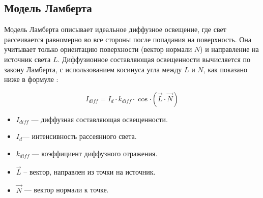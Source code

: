%
%
%
%

\subsection{Модель Ламберта}

Модель Ламберта описывает идеальное диффузное освещение, где свет рассеивается равномерно во все стороны после попадания на поверхность. \cite{lightmodf} Она учитывает только ориентацию поверхности (вектор нормали $N$) и направление на источник света $L$. Диффузионное составляющая освещенности вычисляется по закону Ламберта, с использованием косинуса угла между $L$ и $N$, как показано ниже в формуле \cite{lightmod}:


\begin{equation}\label{lamber}
	I_{diff}=I_{d} \cdot k_{diff} \cdot \cos{\cdot (\vec L \cdot \vec N)}
\end{equation}

\begin{itemize}
	\item $I_{diff}​$ --- диффузная составляющая освещенности.
	\item $I_{d}$​ --- интенсивность рассеянного света.
	\item $k_{diff}​$ --- коэффициент диффузного отражения.
	\item $\vec L$ -- вектор, направлен из точки на источник.
	\item $\vec N$ --- вектор нормали к точке.
\end{itemize}

